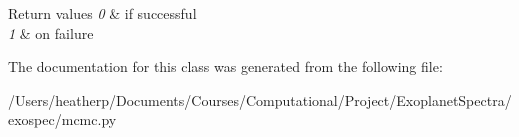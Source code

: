 \begin{DoxyRetVals}{Return values}
{\em 0} & if successful \\
\hline
{\em 1} & on failure \\
\hline
\end{DoxyRetVals}


The documentation for this class was generated from the following file\+:\begin{DoxyCompactItemize}
\item 
/\+Users/heatherp/\+Documents/\+Courses/\+Computational/\+Project/\+Exoplanet\+Spectra/exospec/mcmc.\+py\end{DoxyCompactItemize}
